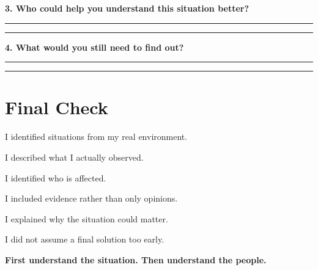 \documentclass[12pt,a4paper]{article}
\newcommand{\checkbox}{\fbox{\rule{0pt}{0.8ex}\rule{0.8ex}{0pt}}}
\begin{document}
	\vspace{0.4cm}
	
	\textbf{3. Who could help you understand this situation better?}
	
	\vspace{0.1cm}
	
	\rule{\linewidth}{0.4pt}
	
	\vspace{0.35cm}
	
	\rule{\linewidth}{0.4pt}
	
	\vspace{0.4cm}
	
	\textbf{4. What would you still need to find out?}
	
	\vspace{0.1cm}
	
	\rule{\linewidth}{0.4pt}
	
	\vspace{0.35cm}
	
	\rule{\linewidth}{0.4pt}
	
	\section*{Final Check}
	
	\noindent\checkbox\quad I identified situations from my real environment.
	
	\vspace{0.15cm}
	
	\noindent\checkbox\quad I described what I actually observed.
	
	\vspace{0.15cm}
	
	\noindent\checkbox\quad I identified who is affected.
	
	\vspace{0.15cm}
	
	\noindent\checkbox\quad I included evidence rather than only opinions.
	
	\vspace{0.15cm}
	
	\noindent\checkbox\quad I explained why the situation could matter.
	
	\vspace{0.15cm}
	
	\noindent\checkbox\quad I did not assume a final solution too early.
	
	\vspace{0.3cm}
	
	\begin{center}
		\textbf{First understand the situation. Then understand the people.}
	\end{center}
	
\end{document}
